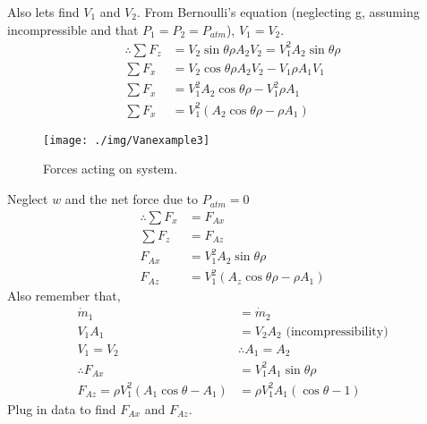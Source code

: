 Also lets find $V_1$ and $V_2$. From Bernoulli's equation (neglecting g, assuming incompressible and that $P_1 = P_2 = P_{atm}$), $V_1 = V_2$.
\begin{align}
  \therefore \sum F_z & = V_2 \sin{\theta} \rho A_2 V_2 = V_1^2 A_2 \sin{\theta} \rho \\
  \sum F_x            & = V_2 \cos{\theta} \rho A_2 V_2 - V_1 \rho A_1 V_1            \\
  \sum F_x            & = V_1^2 A_2 \cos{\theta} \rho - V_1^2 \rho A_1                \\
  \sum F_x            & = V_1^2 (A_2 \cos{\theta} \rho - \rho A_1)
\end{align}
\begin{figure}
  \centering
  \texttt{[image: ./img/Vanexample3]}
  \caption{Forces acting on system.}
\end{figure}
Neglect $w$ and the net force due to $P_{atm} = 0$
\begin{align}
  \therefore \sum F_x & = F_{Ax}                                   \\
  \sum F_z            & = F_{Az}                                   \\
  F_{Ax}              & = V_1^2 A_2 \sin{\theta} \rho              \\
  F_{Az}              & = V_1^2 (A_z \cos{\theta} \rho - \rho A_1)
\end{align}
Also remember that,
\begin{align}
  \dot{m}_1                                    & = \dot{m}_2                             \\
  V_1 A_1                                      & = V_2 A_2 \textrm{ (incompressibility)} \\
  V_1 = V_2                                    & \therefore A_1 = A_2                    \\
  \therefore F_{Ax}                            & = V_1^2 A_1 \sin{\theta} \rho           \\
  F_{Az} = \rho V_1^2 (A_1 \cos{\theta} - A_1) & = \rho V_1^2 A_1 (\cos{\theta} - 1)
\end{align}
Plug in data to find $F_{Ax}$ and $F_{Az}$.
